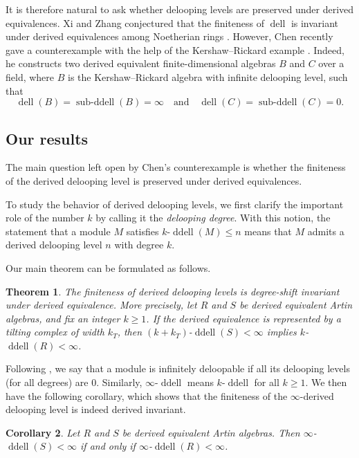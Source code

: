 \documentclass[12pt,a4paper,reqno]{amsart}
\theoremstyle{plain}
\newtheorem{theorem}{Theorem}[section]
\newtheorem{corollary}[theorem]{Corollary}
\theoremstyle{definition}
\theoremstyle{remark}
\DeclareMathOperator{\dell}{dell}
\DeclareMathOperator{\subddell}{sub\text{-}ddell}
\DeclareMathOperator{\ddell}{ddell}
\begin{document}
It is therefore natural to ask whether delooping levels are preserved under derived equivalences. Xi and Zhang conjectured that the finiteness of $\dell$ is invariant under derived equivalences among Noetherian rings \cite{XiZhang}. However, Chen \cite{Chen} recently gave a counterexample with the help of the Kershaw--Rickard example \cite{KershawRickard}. Indeed, he constructs two derived equivalent finite-dimensional algebras $B$ and $C$ over a field, where $B$ is the Kershaw--Rickard algebra \cite{KershawRickard} with infinite delooping level, such that
\[
\dell(B) = \subddell(B) = \infty \quad \text{and} \quad \dell(C) = \subddell(C) = 0.
\]

\subsection{Our results}

The main question left open by Chen's counterexample is whether the finiteness of the derived delooping level is preserved under derived equivalences. 

To study the behavior of derived delooping levels, we first clarify the important role of the number $k$ by calling it the \emph{delooping degree}. With this notion, the statement that a module $M$ satisfies $k$-$\ddell(M)\le n$ means that $M$ admits a derived delooping level $n$ with degree $k$. 

Our main theorem can be formulated as follows.

\begin{theorem}\label{thm:main-intro}
The finiteness of derived delooping levels is degree-shift invariant under derived equivalence. More precisely, 
let $R$ and $S$ be derived equivalent Artin algebras, and fix an integer $k\ge 1$. If the derived equivalence is represented by a tilting complex of width $k_T$, then $(k+k_T)$-$\ddell (S)<\infty$ implies $k$-$\ddell (R)<\infty$.
\end{theorem}

Following \cite{GuoIgusa}, we say that a module is infinitely deloopable if all its delooping levels (for all degrees) are $0$. Similarly, $\infty$-$\ddell$ means $k$-$\ddell$ for all $k\ge 1$. We then have the following corollary, which shows that the finiteness of the $\infty$-derived delooping level is indeed derived invariant.

\begin{corollary} \label{cor:main-intro}
Let $R$ and $S$ be derived equivalent Artin algebras. Then $\infty$-$\ddell (S)<\infty$ if and only if $\infty$-$\ddell (R)<\infty$.
\end{corollary}
\end{document}
